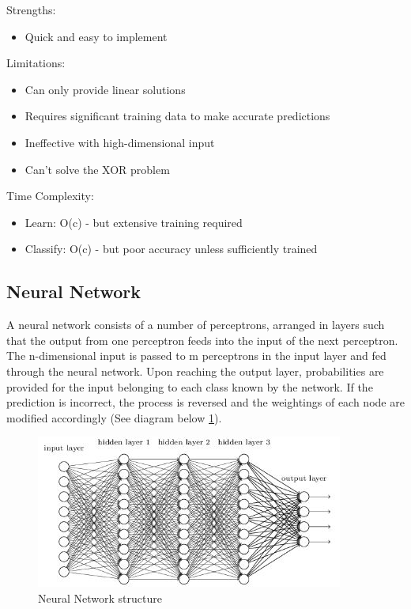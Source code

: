 Strengths:
\begin{itemize}
    \item Quick and easy to implement
\end{itemize}
Limitations:
\begin{itemize}
    \item Can only provide linear solutions
    \item Requires significant training data to make accurate predictions
    \item Ineffective with high-dimensional input
    \item Can’t solve the XOR problem
\end{itemize}
Time Complexity:
\begin{itemize}
    \item Learn: O(c) - but extensive training required
    \item Classify: O(c) - but poor accuracy unless sufficiently trained
\end{itemize}
\citep{perceptron_2}

\subsection{Neural Network}
A neural network consists of a number of perceptrons, arranged in layers such that the output from one perceptron feeds into the input of the next perceptron. The n-dimensional input is passed to m perceptrons in the input layer and fed through the neural network. Upon reaching the output layer, probabilities are provided for the input belonging to each class known by the network. If the prediction is incorrect, the process is reversed and the weightings of each node are modified accordingly \citep{neuralnetwork} (See diagram below \ref{fig:neuralnetwork_img}). 

\begin{figure}[H]
    \centering
    \includegraphics{figs/8/NN_img}
    \caption{Neural Network structure}
    \label{fig:neuralnetwork_img}
\end{figure}

